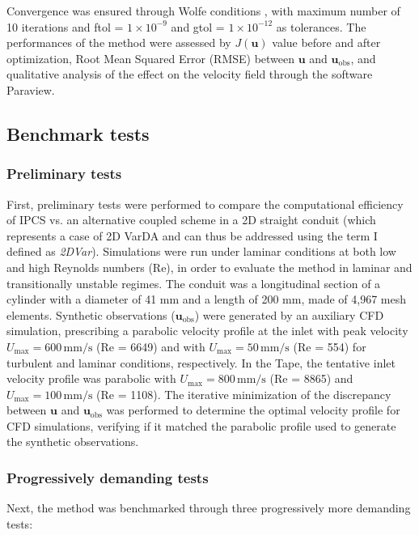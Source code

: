 Convergence was ensured through Wolfe conditions \citep{Nocedal2006}, with maximum number of 10 iterations and ftol = $1 \times 10^{-9}$ and gtol = $1 \times 10^{-12}$ as tolerances.
The performances of the method were assessed by $J(\textbf{u})$ value before and after optimization, Root Mean Squared Error (RMSE) between \( \mathbf{u}\) and \( \mathbf{u}_{\text{obs}} \), and qualitative analysis of the effect on the velocity field through the software Paraview.

\subsection*{Benchmark tests}

\label{sec:bench}
\subsubsection*{Preliminary tests}
First, preliminary tests were performed to compare the computational efficiency of IPCS vs. an alternative coupled scheme \citep{Figueroa2006} in a 2D straight conduit (which represents a case of 2D VarDA and can thus be addressed using the term I defined as \emph{2DVar}). Simulations were run under laminar conditions at both low and high Reynolds numbers (Re), in order to evaluate the method in laminar and transitionally unstable regimes.  
The conduit was a longitudinal section of a cylinder with a diameter of 41 mm and a length of 200 mm, made of 4,967 mesh elements. Synthetic observations (\( \mathbf{u}_{\text{obs}} \)) were generated by an auxiliary CFD simulation, prescribing a parabolic velocity profile at the inlet with peak velocity \( U_{\text{max}} = 600 \, \text{mm/s} \) (Re = 6649) and with \( U_{\text{max}} = 50 \, \text{mm/s} \) (Re = 554) for turbulent and laminar conditions, respectively.
In the Tape, the tentative inlet velocity profile was parabolic with \( U_{\text{max}} = 800 \, \text{mm/s} \) (Re = 8865) and \( U_{\text{max}} = 100 \, \text{mm/s} \) (Re = 1108).
The iterative minimization of the discrepancy between \( \mathbf{u} \) and \( \mathbf{u}_{\text{obs}} \) was performed to determine the optimal velocity profile for CFD simulations, verifying if it matched the parabolic profile used to generate the synthetic observations.\\


\subsubsection*{Progressively demanding tests}
Next, the method was benchmarked through three progressively more demanding tests:

